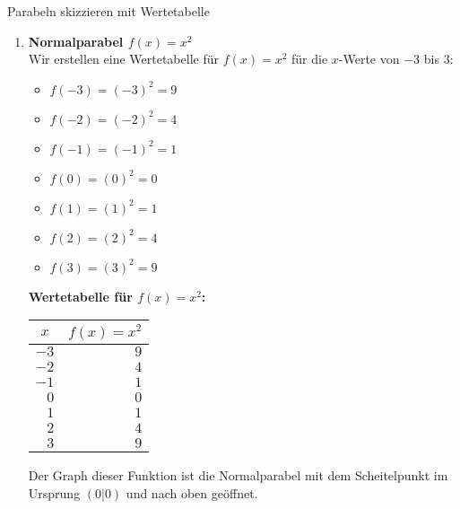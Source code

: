 \begin{loesungsumgebung}{Parabeln skizzieren mit Wertetabelle}

\begin{enumerate}[label=(\alph*)]
    \item \textbf{Normalparabel $f(x)=x^2$} \\
    Wir erstellen eine Wertetabelle für $f(x)=x^2$ für die $x$-Werte von $-3$ bis $3$:
    \begin{itemize}
        \item $f(-3) = (-3)^2 = 9$
        \item $f(-2) = (-2)^2 = 4$
        \item $f(-1) = (-1)^2 = 1$
        \item $f(0) = (0)^2 = 0$
        \item $f(1) = (1)^2 = 1$
        \item $f(2) = (2)^2 = 4$
        \item $f(3) = (3)^2 = 9$
    \end{itemize}
    \textbf{Wertetabelle für $f(x)=x^2$:}
    \begin{center}
    \begin{tabular}{r r}
    \toprule
    \multicolumn{1}{c}{$x$} & \multicolumn{1}{c}{$f(x)=x^2$} \\
    \midrule
    $-3$ & $9$ \\
    $-2$ & $4$ \\
    $-1$ & $1$ \\
    $0$ & $0$ \\
    $1$ & $1$ \\
    $2$ & $4$ \\
    $3$ & $9$ \\
    \bottomrule
    \end{tabular}
    \end{center}
    Der Graph dieser Funktion ist die Normalparabel mit dem Scheitelpunkt im Ursprung $(0|0)$ und nach oben geöffnet.


\end{enumerate}
\end{loesungsumgebung}
